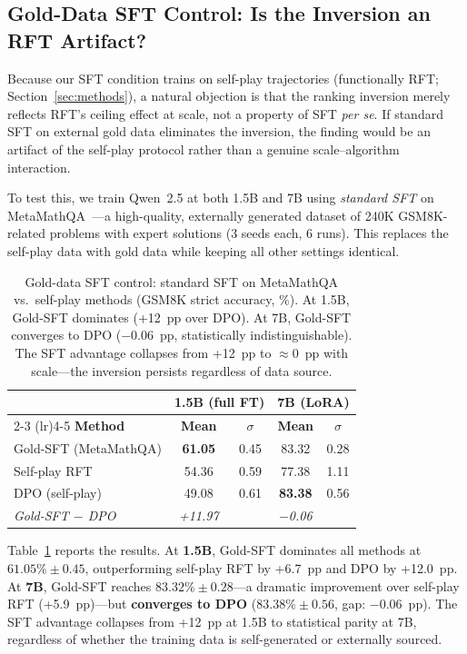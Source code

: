 \documentclass{article}
\begin{document}
\subsection{Gold-Data SFT Control: Is the Inversion an RFT Artifact?}
\label{sec:gold_sft}

Because our SFT condition trains on self-play trajectories (functionally RFT; Section~\ref{sec:methods}), a natural objection is that the ranking inversion merely reflects RFT's ceiling effect at scale, not a property of SFT \emph{per se}. If standard SFT on external gold data eliminates the inversion, the finding would be an artifact of the self-play protocol rather than a genuine scale--algorithm interaction.

To test this, we train Qwen~2.5 at both 1.5B and 7B using \emph{standard SFT} on MetaMathQA~\citep{yu2023metamath}---a high-quality, externally generated dataset of 240K GSM8K-related problems with expert solutions (3 seeds each, 6 runs). This replaces the self-play data with gold data while keeping all other settings identical.

\begin{table}[h]
\centering
\caption{Gold-data SFT control: standard SFT on MetaMathQA vs.\ self-play methods (GSM8K strict accuracy, \%). At 1.5B, Gold-SFT dominates (+12~pp over DPO). At 7B, Gold-SFT converges to DPO ($-$0.06~pp, statistically indistinguishable). The SFT advantage collapses from +12~pp to $\approx$0~pp with scale---the inversion persists regardless of data source.}
\begin{tabular}{lcccc}
\toprule
& \multicolumn{2}{c}{\textbf{1.5B (full FT)}} & \multicolumn{2}{c}{\textbf{7B (LoRA)}} \\
\cmidrule(lr){2-3} \cmidrule(lr){4-5}
\textbf{Method} & \textbf{Mean} & $\sigma$ & \textbf{Mean} & $\sigma$ \\
\midrule
Gold-SFT (MetaMathQA) & \textbf{61.05} & 0.45 & 83.32 & 0.28 \\
Self-play RFT & 54.36 & 0.59 & 77.38 & 1.11 \\
DPO (self-play) & 49.08 & 0.61 & \textbf{83.38} & 0.56 \\
\midrule
\textit{Gold-SFT $-$ DPO} & \textit{+11.97} & & \textit{$-$0.06} & \\
\bottomrule
\end{tabular}
\label{tab:gold_sft}
\end{table}

Table~\ref{tab:gold_sft} reports the results. At \textbf{1.5B}, Gold-SFT dominates all methods at $61.05\% \pm 0.45$, outperforming self-play RFT by +6.7~pp and DPO by +12.0~pp. At \textbf{7B}, Gold-SFT reaches $83.32\% \pm 0.28$---a dramatic improvement over self-play RFT (+5.9~pp)---but \textbf{converges to DPO} ($83.38\% \pm 0.56$, gap: $-$0.06~pp). The SFT advantage collapses from +12~pp at 1.5B to statistical parity at 7B, regardless of whether the training data is self-generated or externally sourced.
\end{document}

